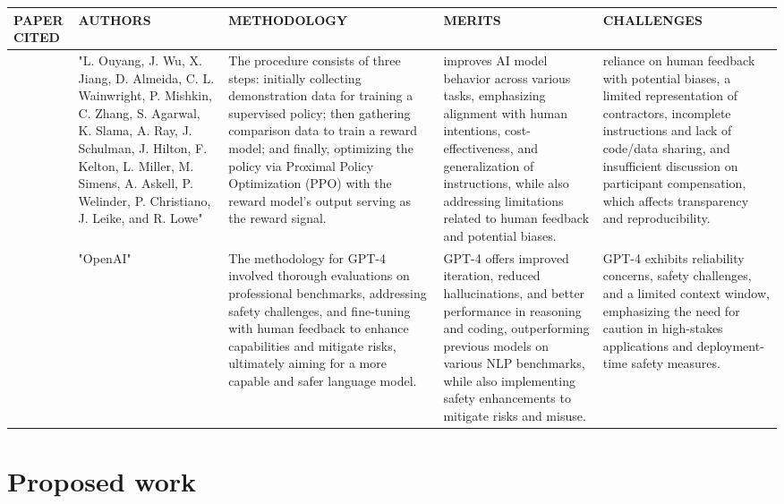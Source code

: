 \documentclass[conference]{IEEEtran}
\begin{document}
\begin{table}
\begin{center}
 \centering
    \begin{tabular}{ |p{1cm}|p{2cm}|p{4cm}|p{4cm}|p{4cm}| }
\hline
\centering PAPER CITED & \centering  AUTHORS & \centering METHODOLOGY &  \centering MERITS &  \centering CHALLENGES \arraybackslash \\ 
\hline
[39]  & "L. Ouyang, J. Wu, X. Jiang, D. Almeida, C. L. Wainwright, P. Mishkin, C. Zhang, S. Agarwal, K. Slama, A. Ray, J. Schulman, J. Hilton, F. Kelton, L. Miller, M. Simens, A. Askell, P. Welinder, P. Christiano, J. Leike, and R. Lowe" & The procedure consists of three steps: initially collecting demonstration data for training a supervised policy; then gathering comparison data to train a reward model; and finally, optimizing the policy via Proximal Policy Optimization (PPO) with the reward model's output serving as the reward signal. & improves AI model behavior across various tasks, emphasizing alignment with human intentions, cost-effectiveness, and generalization of instructions, while also addressing limitations related to human feedback and potential biases. & reliance on human feedback with potential biases, a limited representation of contractors, incomplete instructions and lack of code/data sharing, and insufficient discussion on participant compensation, which affects transparency and reproducibility. \\
\hline
[40]& "OpenAI" & The methodology for GPT-4 involved thorough evaluations on professional benchmarks, addressing safety challenges, and fine-tuning with human feedback to enhance capabilities and mitigate risks, ultimately aiming for a more capable and safer language model. & GPT-4 offers improved iteration, reduced hallucinations, and better performance in reasoning and coding, outperforming previous models on various NLP benchmarks, while also implementing safety enhancements to mitigate risks and misuse. & GPT-4 exhibits reliability concerns, safety challenges, and a limited context window, emphasizing the need for caution in high-stakes applications and deployment-time safety measures. \\
\hline
\end{tabular}
\end{center}
\end{table}







\section{Proposed work}
\end{document}
